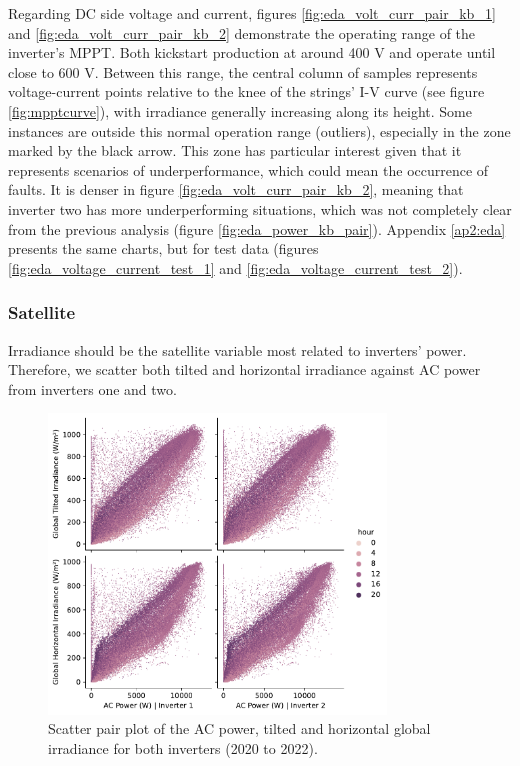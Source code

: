 Regarding DC side voltage and current, figures \ref{fig:eda_volt_curr_pair_kb_1} and \ref{fig:eda_volt_curr_pair_kb_2} demonstrate the operating range of the inverter's MPPT. Both kickstart production at around 400 V and operate until close to 600 V. Between this range, the central column of samples represents voltage-current points relative to the knee of the strings' I-V curve (see figure \ref{fig:mpptcurve}), with irradiance generally increasing along its height. Some instances are outside this normal operation range (outliers), especially in the zone marked by the black arrow. This zone has particular interest given that it represents scenarios of underperformance, which could mean the occurrence of faults. It is denser in figure \ref{fig:eda_volt_curr_pair_kb_2}, meaning that inverter two has more underperforming situations, which was not completely clear from the previous analysis (figure \ref{fig:eda_power_kb_pair}). Appendix \ref{ap2:eda} presents the same charts, but for test data (figures \ref{fig:eda_voltage_current_test_1} and \ref{fig:eda_voltage_current_test_2}).

\subsubsection{Satellite} \label{subsubsec:eda_sat}

Irradiance should be the satellite variable most related to inverters' power. Therefore, we scatter both tilted and horizontal irradiance against AC power from inverters one and two.

\begin{figure}[h!]
    \centering
    \includegraphics[width=0.8\textwidth]{figures/chapter5/analysis/08_power_irrad_pairplot_scatter_kb.pdf}
    \caption{Scatter pair plot of the AC power, tilted and horizontal global irradiance for both inverters (2020 to 2022).}
    \label{fig:eda_power_irrad_pair_kb}
\end{figure}


